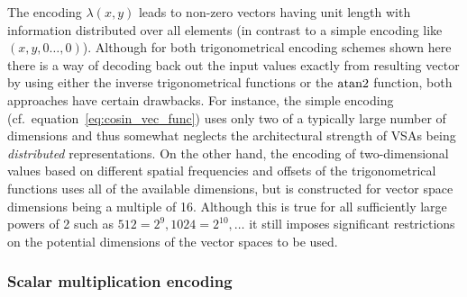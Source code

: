 The encoding $\lambda\left(x, y\right)$ leads to non-zero vectors having unit length with information distributed over all elements (in contrast to a simple encoding like $\left(x, y, 0 \ldots, 0\right)$).
Although for both trigonometrical encoding schemes shown here there is a way of decoding back out the input values exactly from resulting vector by using either the inverse trigonometrical functions or the $\operatorname{atan2}$ function, both approaches have certain drawbacks.
For instance, the simple encoding (cf.\ equation~\eqref{eq:cosin_vec_func}) uses only two of a typically large number of dimensions and thus somewhat neglects the architectural strength of \acp{VSA} being \emph{distributed} representations.
On the other hand, the encoding of two-dimensional values based on different spatial frequencies and offsets of the trigonometrical functions uses all of the available dimensions, but is constructed for vector space dimensions being a multiple of \num{16}.
Although this is true for all sufficiently large powers of \num{2} such as $512=2^{9}, 1024=2^{10}, \ldots$ it still imposes significant restrictions on the potential dimensions of the vector spaces to be used.

\subsubsection{Scalar multiplication encoding}%
\label{ssubsec:scalar_multiplication_encoding}

